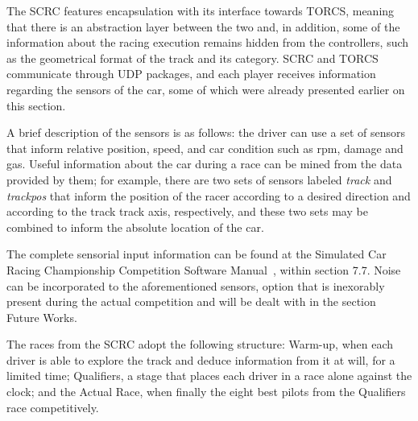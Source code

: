 	The SCRC features encapsulation with its interface towards TORCS, meaning that there is an abstraction layer
	between the two and, in addition, some of the information about the racing execution remains hidden from the
	controllers, such as the geometrical format of the track and its category. SCRC and TORCS communicate through
	UDP packages, and each player receives information regarding the sensors of the car, some of which were already
	presented earlier on this section.
	
	A brief description of the sensors is as follows: the driver can use a set of sensors that inform relative
	position, speed, and car condition such as rpm, damage and gas. Useful information about the car during a
	race can be mined from the data provided by them; for example, there are two sets of sensors labeled
	\emph{track} and \emph{trackpos} that inform the position of the racer according to a desired direction and
	according to the track track axis, respectively, and these two sets may be combined to inform the absolute
	location of the car.
	
	The complete sensorial input information can be found at the Simulated Car Racing Championship Competition
	Software Manual~\cite{SCRC}, within section 7.7. Noise can be incorporated to the aforementioned sensors,
	option that is inexorably present during the actual competition and will be dealt with in the section Future
	Works.
	
	The races from the SCRC adopt the following structure: Warm-up, when each driver is able to explore the track
	and deduce information from it at will, for a limited time; Qualifiers, a stage that places each driver in a
	race alone against the clock; and the Actual Race, when finally the eight best pilots from the Qualifiers race
	competitively.
